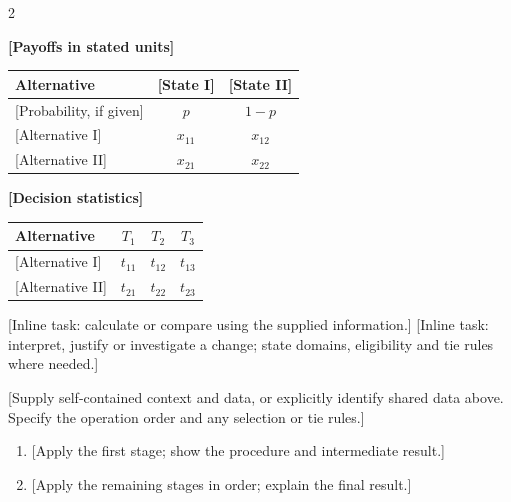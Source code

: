 \begin{multicols}{2}
\noindent\begin{minipage}{\linewidth}
\small\textbf{[Payoffs in stated units]}\par\smallskip
\setlength{\tabcolsep}{3pt}
\begin{tabularx}{\linewidth}{@{}Xcc@{}}
\toprule Alternative & [State I] & [State II]\\\midrule
{[Probability, if given]} & $p$ & $1-p$\\
{[Alternative I]} & $x_{11}$ & $x_{12}$\\
{[Alternative II]} & $x_{21}$ & $x_{22}$\\\bottomrule
\end{tabularx}
\end{minipage}\par
\noindent\begin{minipage}{\linewidth}
\small\textbf{[Decision statistics]}\par
[Define each statistic and whether larger or smaller is preferred.]
\setlength{\tabcolsep}{3pt}
\begin{tabularx}{\linewidth}{@{}Xccc@{}}
\toprule Alternative & $T_1$ & $T_2$ & $T_3$\\\midrule
{[Alternative I]} & $t_{11}$ & $t_{12}$ & $t_{13}$\\
{[Alternative II]} & $t_{21}$ & $t_{22}$ & $t_{23}$\\\bottomrule
\end{tabularx}
\end{minipage}\par
[Inline task: calculate or compare using the supplied information.]
[Inline task: interpret, justify or investigate a change; state domains,
eligibility and tie rules where needed.] 

[Supply self-contained context and data, or explicitly identify shared data
above. Specify the operation order and any selection or tie rules.]
\begin{enumerate}[label=(\alph*)]
\item {[Apply the first stage; show the procedure and intermediate result.]}
\item {[Apply the remaining stages in order; explain the final result.]}
\end{enumerate}


\end{multicols}
